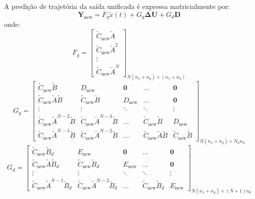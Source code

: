 \documentclass[12pt]{article}
\begin{document}
A predição de trajetória da saída unificada é expressa matricialmente por:
\begin{equation}
\label{eq:saida_matricial_final}
\bm{Y}_{\text{new}} = F_y \tilde{x}(t) + G_y \bm{\Delta U} + G_d \bm{D}
\end{equation}
onde:
\begin{equation}
F_y = \begin{bmatrix} \tilde{C}_{\text{new}}\tilde{A} \\ \tilde{C}_{\text{new}}\tilde{A}^2 \\ \vdots \\ \tilde{C}_{\text{new}}\tilde{A}^N \end{bmatrix}_{N(n_x+n_y) \times (n_x+n_u)}
\end{equation}
\begin{equation}
G_y = \begin{bmatrix}
\tilde{C}_{\text{new}}\tilde{B} & D_{\text{new}} & \bm{0} & \dots & \bm{0} \\
\tilde{C}_{\text{new}}\tilde{A}\tilde{B} & \tilde{C}_{\text{new}}\tilde{B} & D_{\text{new}} & \dots & \bm{0} \\
\vdots & \vdots & \ddots & \ddots & \vdots \\
\tilde{C}_{\text{new}}\tilde{A}^{N-2}\tilde{B} & \tilde{C}_{\text{new}}\tilde{A}^{N-3}\tilde{B} & \dots & \tilde{C}_{\text{new}}\tilde{B} & D_{\text{new}} \\
\tilde{C}_{\text{new}}\tilde{A}^{N-1}\tilde{B} & \tilde{C}_{\text{new}}\tilde{A}^{N-2}\tilde{B} & \dots & \tilde{C}_{\text{new}}\tilde{A}\tilde{B} & \tilde{C}_{\text{new}}\tilde{B}
\end{bmatrix}_{N(n_x+n_y) \times N_u n_u}
\end{equation}
\begin{equation}
G_d = \begin{bmatrix}
\tilde{C}_{\text{new}}\tilde{B}_d & E_{\text{new}} & \bm{0} & \dots & \bm{0} \\
\tilde{C}_{\text{new}}\tilde{A}\tilde{B}_d & \tilde{C}_{\text{new}}\tilde{B}_d & E_{\text{new}} & \dots & \bm{0} \\
\vdots & \vdots & \ddots & \ddots & \vdots \\
\tilde{C}_{\text{new}}\tilde{A}^{N-1}\tilde{B}_d & \tilde{C}_{\text{new}}\tilde{A}^{N-2}\tilde{B}_d & \dots & \tilde{C}_{\text{new}}\tilde{B}_d & E_{\text{new}}
\end{bmatrix}_{N(n_x+n_y) \times (N+1)n_d}
\end{equation}
\end{document}
